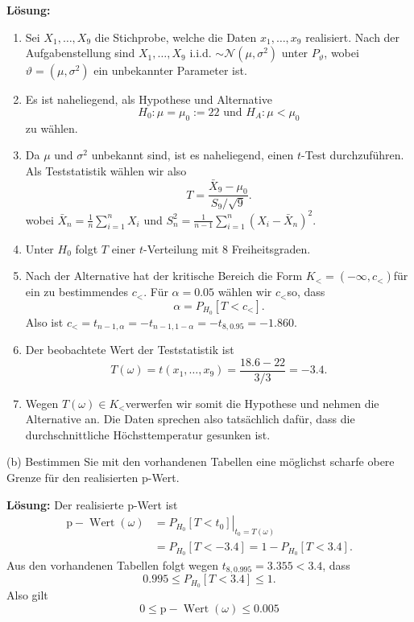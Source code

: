 \textbf{Lösung:}
\begin{enumerate}[label=\roman*]
	\item Sei $X_{1}, \ldots, X_{9}$ die Stichprobe, welche die Daten $x_{1}, \ldots, x_{9}$ realisiert. Nach der Aufgabenstellung sind $X_{1}, \ldots, X_{9}$ i.i.d. $\sim \mathcal{N}\left(\mu, \sigma^{2}\right)$ unter $P_{\vartheta}$, wobei $\vartheta=\left(\mu, \sigma^{2}\right)$ ein unbekannter Parameter ist.
	\item Es ist naheliegend, als Hypothese und Alternative
$$
H_{0}: \mu=\mu_{0}:=22 \text { und } H_{A}: \mu<\mu_{0}
$$
zu wählen.
	\item Da $\mu$ und $\sigma^{2}$ unbekannt sind, ist es naheliegend, einen $t$-Test durchzuführen. Als Teststatistik wählen wir also
$$
T=\frac{\bar{X}_{9}-\mu_{0}}{S_{9} / \sqrt{9}} .
$$
wobei $\bar{X}_{n}=\frac{1}{n} \sum_{i=1}^{n} X_{i}$ und $S_{n}^{2}=\frac{1}{n-1} \sum_{i=1}^{n}\left(X_{i}-\bar{X}_{n}\right)^{2}$.
	\item Unter $H_{0}$ folgt $T$ einer $t$-Verteilung mit 8 Freiheitsgraden.
	\item Nach der Alternative hat der kritische Bereich die Form $K_{<}=\left(-\infty, c_{<}\right)$für ein zu bestimmendes $c_{<}$. Für $\alpha=0.05$ wählen wir $c_{<}$so, dass
	$$
	\alpha=P_{H_{0}}\left[T<c_{<}\right] .
	$$
	Also ist $c_{<}=t_{n-1, \alpha}=-t_{n-1,1-\alpha}=-t_{8,0.95}=-1.860$.
	\item Der beobachtete Wert der Teststatistik ist
	$$
	T(\omega)=t\left(x_{1}, \ldots, x_{9}\right)=\frac{18.6-22}{3 / 3}=-3.4 .
	$$
	\item Wegen $T(\omega) \in K_{<}$verwerfen wir somit die Hypothese und nehmen die Alternative an. Die Daten sprechen also tatsächlich dafür, dass die durchschnittliche Höchsttemperatur gesunken ist.
\end{enumerate}
(b) Bestimmen Sie mit den vorhandenen Tabellen eine möglichst scharfe obere Grenze für den realisierten p-Wert.

\textbf{Lösung:}
Der realisierte p-Wert ist
\begin{align*}
	\mathrm{p}-\operatorname{Wert}(\omega) & =\left.P_{H_{0}}\left[T<t_{0}\right]\right|_{t_{0}=T(\omega)}\\ & =P_{H_{0}}[T<-3.4]=1-P_{H_{0}}[T<3.4] .
\end{align*}
Aus den vorhandenen Tabellen folgt wegen $t_{8,0.995}=3.355<3.4$, dass
$$
0.995 \leq P_{H_{0}}[T<3.4] \leq 1 .
$$
Also gilt
$$
0 \leq \mathrm{p}-\operatorname{Wert}(\omega) \leq 0.005
$$
\hrulefill

